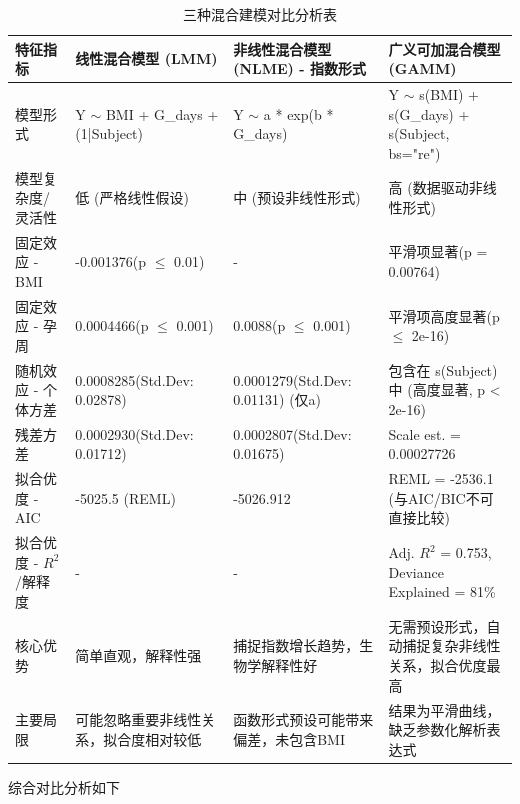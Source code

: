 \documentclass{article}
\begin{document}
\begin{table}[htbp]
    \centering
    \setlength{\tabcolsep}{2pt}  %
    \small  %
    \caption{三种混合建模对比分析表}
    \renewcommand{\arraystretch}{1.5}  %
    \begin{tabularx}{\linewidth}{@{}X X X X@{}}  %
        \toprule
        特征指标             & 线性混合模型 (LMM)                         & 非线性混合模型 (NLME) - 指数形式            & 广义可加混合模型 (GAMM)                                    \\
        \midrule
        模型形式             & Y $\sim$ BMI + G\_days + (1|Subject) & Y $\sim$ a * exp(b * G\_days)    & Y $\sim$ s(BMI) + s(G\_days) + s(Subject, bs="re") \\
        模型复杂度/灵活性        & 低 (严格线性假设)                           & 中 (预设非线性形式)                      & 高 (数据驱动非线性形式)                                      \\
        固定效应 - BMI       & -0.001376(p $\leq$ 0.01)             & -                                & 平滑项显著(p = 0.00764)                                 \\
        固定效应 - 孕周        & 0.0004466(p $\leq$ 0.001)            & 0.0088(p $\leq$ 0.001)           & 平滑项高度显著(p $\leq$ 2e-16)                            \\
        随机效应 - 个体方差      & 0.0008285(Std.Dev: 0.02878)          & 0.0001279(Std.Dev: 0.01131) (仅a) & 包含在 s(Subject) 中 (高度显著, p < 2e-16)                 \\
        残差方差             & 0.0002930(Std.Dev: 0.01712)          & 0.0002807(Std.Dev: 0.01675)      & Scale est. = 0.00027726                            \\
        拟合优度 - AIC       & -5025.5 (REML)                       & -5026.912                        & REML = -2536.1 (与AIC/BIC不可直接比较)                    \\
        拟合优度 - $R^2$/解释度 & -                                    & -                                & Adj. $R^2$ = 0.753, Deviance Explained = 81\%      \\
        核心优势             & 简单直观，解释性强                            & 捕捉指数增长趋势，生物学解释性好                 & 无需预设形式，自动捕捉复杂非线性关系，拟合优度最高                          \\
        主要局限             & 可能忽略重要非线性关系，拟合度相对较低                  & 函数形式预设可能带来偏差，未包含BMI              & 结果为平滑曲线，缺乏参数化解析表达式                                 \\
        \bottomrule
    \end{tabularx}
    \label{tab:model_comparison}
\end{table}
综合对比分析如下
\end{document}
